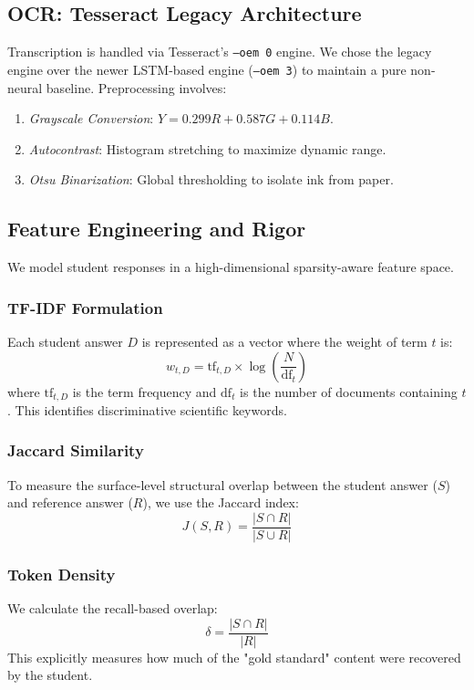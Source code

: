 \documentclass[conference]{IEEEtran}
\begin{document}
\subsection{OCR: Tesseract Legacy Architecture}
Transcription is handled via Tesseract's \texttt{--oem 0} engine. We chose the legacy engine over the newer LSTM-based engine (\texttt{--oem 3}) to maintain a pure non-neural baseline. Preprocessing involves:
\begin{enumerate}
    \item \textit{Grayscale Conversion}: $Y = 0.299R + 0.587G + 0.114B$.
    \item \textit{Autocontrast}: Histogram stretching to maximize dynamic range.
    \item \textit{Otsu Binarization}: Global thresholding to isolate ink from paper.
\end{enumerate}

\subsection{Feature Engineering and Rigor}
We model student responses in a high-dimensional sparsity-aware feature space.

\subsubsection{TF-IDF Formulation}
Each student answer $D$ is represented as a vector where the weight of term $t$ is:
\begin{equation}
w_{t,D} = \text{tf}_{t,D} \times \log\left(\frac{N}{\text{df}_t}\right)
\end{equation}
where $\text{tf}_{t,D}$ is the term frequency and $\text{df}_t$ is the number of documents containing $t$. This identifies discriminative scientific keywords.

\subsubsection{Jaccard Similarity}
To measure the surface-level structural overlap between the student answer ($S$) and reference answer ($R$), we use the Jaccard index:
\begin{equation}
J(S,R) = \frac{|S \cap R|}{|S \cup R|}
\end{equation}

\subsubsection{Token Density}
We calculate the recall-based overlap:
\begin{equation}
\delta = \frac{|S \cap R|}{|R|}
\end{equation}
This explicitly measures how much of the "gold standard" content were recovered by the student.
\end{document}
